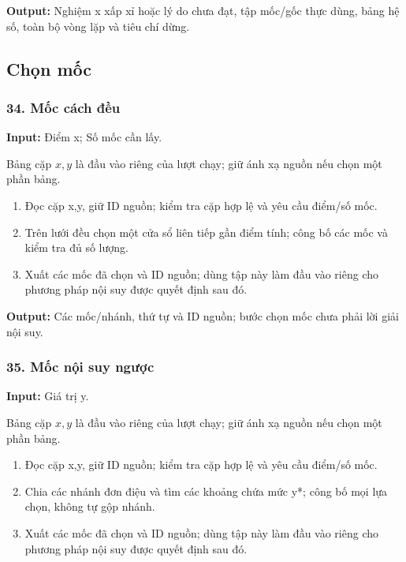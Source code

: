 \textbf{Output:} Nghiệm x xấp xỉ hoặc lý do chưa đạt,\allowbreak{} tập mốc/\allowbreak{}gốc thực dùng,\allowbreak{} bảng hệ số,\allowbreak{} toàn bộ vòng lặp và tiêu chí dừng.

\subsection{Chọn mốc}

\examplebreak\subsubsection*{34. Mốc cách đều}

\textbf{Input:} Điểm x;\allowbreak{} Số mốc cần lấy.

Bảng cặp $x,y$ là đầu vào riêng của lượt chạy; giữ ánh xạ nguồn nếu chọn một phần bảng.

\begin{enumerate}

\item Đọc cặp x,\allowbreak{}y,\allowbreak{} giữ ID nguồn;\allowbreak{} kiểm tra cặp hợp lệ và yêu cầu điểm/\allowbreak{}số mốc.

\item Trên lưới đều chọn một cửa sổ liên tiếp gần điểm tính;\allowbreak{} công bố các mốc và kiểm tra đủ số lượng.

\item Xuất các mốc đã chọn và ID nguồn;\allowbreak{} dùng tập này làm đầu vào riêng cho phương pháp nội suy được quyết định sau đó.

\end{enumerate}

\textbf{Output:} Các mốc/\allowbreak{}nhánh,\allowbreak{} thứ tự và ID nguồn;\allowbreak{} bước chọn mốc chưa phải lời giải nội suy.

\examplebreak\subsubsection*{35. Mốc nội suy ngược}

\textbf{Input:} Giá trị y.

Bảng cặp $x,y$ là đầu vào riêng của lượt chạy; giữ ánh xạ nguồn nếu chọn một phần bảng.

\begin{enumerate}

\item Đọc cặp x,\allowbreak{}y,\allowbreak{} giữ ID nguồn;\allowbreak{} kiểm tra cặp hợp lệ và yêu cầu điểm/\allowbreak{}số mốc.

\item Chia các nhánh đơn điệu và tìm các khoảng chứa mức y*;\allowbreak{} công bố mọi lựa chọn,\allowbreak{} không tự gộp nhánh.

\item Xuất các mốc đã chọn và ID nguồn;\allowbreak{} dùng tập này làm đầu vào riêng cho phương pháp nội suy được quyết định sau đó.

\end{enumerate}

